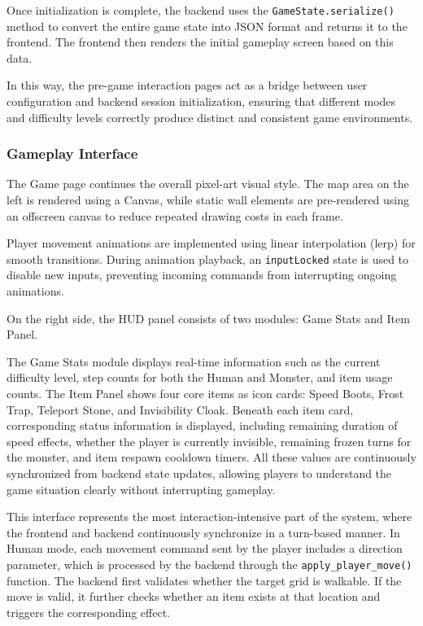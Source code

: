 Once initialization is complete, the backend uses the \texttt{GameState.serialize()} method to convert the entire game state into JSON format and returns it to the frontend. The frontend then renders the initial gameplay screen based on this data.

In this way, the pre-game interaction pages act as a bridge between user configuration and backend session initialization, ensuring that different modes and difficulty levels correctly produce distinct and consistent game environments.

\subsubsection{Gameplay Interface}

The Game page continues the overall pixel-art visual style. The map area on the left is rendered using a Canvas, while static wall elements are pre-rendered using an offscreen canvas to reduce repeated drawing costs in each frame.

Player movement animations are implemented using linear interpolation (lerp) for smooth transitions. During animation playback, an \texttt{inputLocked} state is used to disable new inputs, preventing incoming commands from interrupting ongoing animations.

On the right side, the HUD panel consists of two modules: Game Stats and Item Panel.

The Game Stats module displays real-time information such as the current difficulty level, step counts for both the Human and Monster, and item usage counts. The Item Panel shows four core items as icon cards: Speed Boots, Frost Trap, Teleport Stone, and Invisibility Cloak. Beneath each item card, corresponding status information is displayed, including remaining duration of speed effects, whether the player is currently invisible, remaining frozen turns for the monster, and item respawn cooldown timers. All these values are continuously synchronized from backend state updates, allowing players to understand the game situation clearly without interrupting gameplay.

This interface represents the most interaction-intensive part of the system, where the frontend and backend continuously synchronize in a turn-based manner. In Human mode, each movement command sent by the player includes a direction parameter, which is processed by the backend through the \texttt{apply\_player\_move()} function. The backend first validates whether the target grid is walkable. If the move is valid, it further checks whether an item exists at that location and triggers the corresponding effect.

